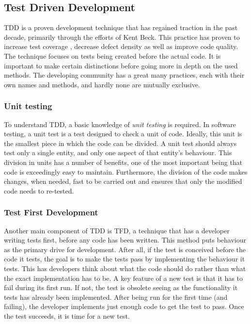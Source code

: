 \documentclass[11pt,british]{article}
\begin{document}
\subsection{Test Driven Development}
\label{subsec:TDD}
\gls{TDD} is a proven development technique that has regained traction in the past decade, primarily through the efforts of Kent Beck.\cite{VHDLUnit,agiletdd} This practice has proven to increase test coverage , decrease defect density \cite{TDDinpractice} as well as improve code quality.\cite{TDDinpractice,Siniaalto,BhatN06} The technique focuses on tests being created before the actual code. It is important to make certain distinctions before going more in depth on the used methods. The developing community has a great many practices, each with their own names and methods, and hardly none are mutually exclusive.

\subsubsection{Unit testing}
To understand \gls{TDD}, a basic knowledge of \emph{unit testing} is required. In software testing, a unit test is a test designed to check a unit of code.\cite{extremeunit,VHDLunit} Ideally, this unit is the smallest piece in which the code can be divided. A unit test should always test only a single entity, and only one aspect of that entity's behaviour. This division in units has a number of benefits, one of the most important being that code is exceedingly easy to maintain. Furthermore, the division of the code makes changes, when needed, fast to be carried out and ensures that only the modified code needs to re-tested.

\subsubsection{Test First Development}
Another main component of \gls{TDD} is \gls{TFD}, a technique that has a developer writing tests first, before any code has been written.\cite{extremeunit} This method puts behaviour as the primary drive for development. After all, if the test is conceived before the code it tests, the goal is to make the tests pass by implementing the behaviour it tests. This has developers think about what the code should do rather than what the exact implementation has to be. A key feature of a new test is that it has to fail during its first run. If not, the test is obsolete seeing as the functionality it tests has already been implemented. After being run for the first time (and failing), the developer implements just enough code to get the test to pass. Once the test succeeds, it is time for a new test.
\end{document}
